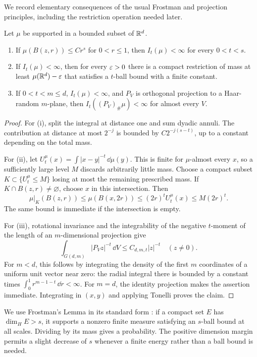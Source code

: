 We record elementary consequences of the usual Frostman and projection
principles, including the restriction operation needed later.

\begin{lemma}\label{conv:energy}
Let \(\mu\) be supported in a bounded subset of \(\mathbb R^d\).
\begin{enumerate}[label=(\roman*)]
\item If \(\mu(B(z,r))\le C r^s\) for \(0<r\le1\), then
\(I_t(\mu)<\infty\) for every \(0<t<s\).
\item If \(I_t(\mu)<\infty\), then for every \(\varepsilon>0\) there is a
compact restriction of mass at least \(\mu(\mathbb R^d)-\varepsilon\) that satisfies
a \(t\)-ball bound with a finite constant.
\item If \(0<t<m\le d\), \(I_t(\mu)<\infty\), and \(P_V\) is
orthogonal projection to a Haar-random \(m\)-plane, then
\(I_t((P_V)_\#\mu)<\infty\) for almost every \(V\).
\end{enumerate}
\end{lemma}

\begin{proof}
For (i), split the integral at distance one and sum dyadic annuli.
The contribution at distance at most \(2^{-j}\) is bounded by
\(C2^{-j(s-t)}\), up to a constant depending on the total mass.

For (ii), let \(U_t^\mu(x)=\int |x-y|^{-t}\,\dd\mu(y)\).
This is finite for \(\mu\)-almost every \(x\), so a sufficiently large
level \(M\) discards arbitrarily little mass. Choose a compact subset
\(K\subset\{U_t^\mu\le M\}\) losing at most the remaining prescribed mass.
If \(K\cap B(z,r)\ne\varnothing\), choose \(x\) in this intersection.
Then
\[
 \mu|_K(B(z,r))
 \le\mu(B(x,2r))\le (2r)^t U_t^\mu(x)\le M(2r)^t.
\]
The same bound is immediate if the intersection is empty.

For (iii), rotational invariance and the integrability of the negative
\(t\)-moment of the length of an \(m\)-dimensional projection give
\[
 \int_{G(d,m)}|P_V z|^{-t}\,\dd V\le C_{d,m,t}|z|^{-t}
 \quad(z\ne0).
\]
For \(m<d\), this follows by integrating the density of the first \(m\)
coordinates of a uniform unit vector near zero: the radial integral there
is bounded by a constant times
\(\int_0^1 r^{m-1-t}\,\dd r<\infty\). For \(m=d\), the identity projection
makes the assertion immediate. Integrating in \((x,y)\) and applying
Tonelli proves the claim.
\end{proof}

We use Frostman's Lemma in its standard form
\cite[Theorem~8.8]{Mattila1995}: if a compact set \(E\)
has \(\dim_H E>s\), it supports a nonzero finite measure satisfying an
\(s\)-ball bound at all scales. Dividing by its mass gives a probability.
The positive dimension margin permits a slight decrease of \(s\) whenever
a finite energy rather than a ball bound is needed.

